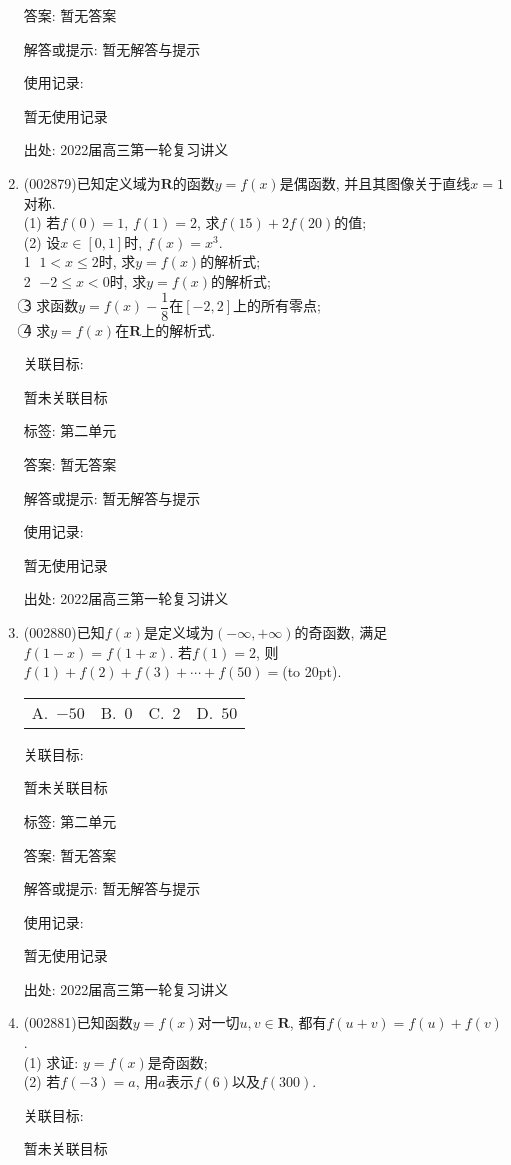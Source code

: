 \documentclass[10pt,a4paper]{article}
\newcommand{\bracket}[1]{(\hbox to #1pt{})}
\newcommand{\fourch}[4]{\par\begin{tabular}{p{.23\textwidth}p{.23\textwidth}p{.23\textwidth}p{.23\textwidth}}
A.~#1 &B.~#2& C.~#3& D.~#4
\end{tabular}}
\begin{document}
\begin{enumerate}[1.]
答案: 暂无答案

解答或提示: 暂无解答与提示

使用记录:

暂无使用记录


出处: 2022届高三第一轮复习讲义
\item { (002879)}已知定义域为$\mathbf{R}$的函数$y=f(x)$是偶函数, 并且其图像关于直线$x=1$对称.\\
(1) 若$f(0)=1$, $f(1)=2$, 求$f(15)+2f(20)$的值;\\
(2) 设$x\in [0,1]$时, $f(x)=x^3$.\\
\textcircled{1} $1<x\le 2$时, 求$y=f(x)$的解析式;\\
\textcircled{2} $-2\le x<0$时, 求$y=f(x)$的解析式;\\
\textcircled{3} 求函数$y=f(x)-\dfrac 18$在$[-2,2]$上的所有零点;\\
\textcircled{4} 求$y=f(x)$在$\mathbf{R}$上的解析式.


关联目标:

暂未关联目标



标签: 第二单元

答案: 暂无答案

解答或提示: 暂无解答与提示

使用记录:

暂无使用记录


出处: 2022届高三第一轮复习讲义
\item { (002880)}已知$f(x)$是定义域为$(-\infty,+\infty)$的奇函数, 满足$f(1-x)=f(1+x)$. 若$f(1)=2$, 则$f(1)+f(2)+f(3)+\cdots +f(50)=$\bracket{20}.
\fourch{$-50$}{$0$}{$2$}{$50$}


关联目标:

暂未关联目标



标签: 第二单元

答案: 暂无答案

解答或提示: 暂无解答与提示

使用记录:

暂无使用记录


出处: 2022届高三第一轮复习讲义
\item { (002881)}已知函数$y=f(x)$对一切$u,v\in \mathbf{R}$, 都有$f(u+v)=f(u)+f(v)$.\\
(1)	求证: $y=f(x)$是奇函数;\\ 
(2) 若$f(-3)=a$, 用$a$表示$f(6)$以及$f(300)$.


关联目标:

暂未关联目标




\end{enumerate}
\end{document}
